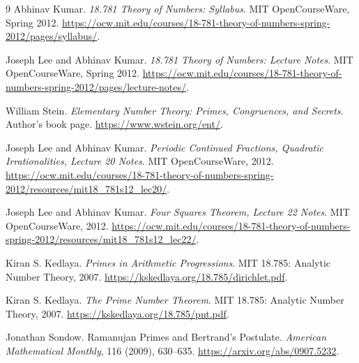 \documentclass[UTF8,12pt,a4paper,fontset=fandol]{ctexbook}
\begin{document}
\begin{thebibliography}{9}
  Abhinav Kumar.
  \textit{18.781 Theory of Numbers: Syllabus}.
  MIT OpenCourseWare, Spring 2012.
  \url{https://ocw.mit.edu/courses/18-781-theory-of-numbers-spring-2012/pages/syllabus/}.

  Joseph Lee and Abhinav Kumar.
  \textit{18.781 Theory of Numbers: Lecture Notes}.
  MIT OpenCourseWare, Spring 2012.
  \url{https://ocw.mit.edu/courses/18-781-theory-of-numbers-spring-2012/pages/lecture-notes/}.

  William Stein.
  \textit{Elementary Number Theory: Primes, Congruences, and Secrets}.
  Author's book page.
  \url{https://www.wstein.org/ent/}.

  Joseph Lee and Abhinav Kumar.
  \textit{Periodic Continued Fractions, Quadratic Irrationalities, Lecture 20 Notes}.
  MIT OpenCourseWare, 2012.
  \url{https://ocw.mit.edu/courses/18-781-theory-of-numbers-spring-2012/resources/mit18_781s12_lec20/}.

  Joseph Lee and Abhinav Kumar.
  \textit{Four Squares Theorem, Lecture 22 Notes}.
  MIT OpenCourseWare, 2012.
  \url{https://ocw.mit.edu/courses/18-781-theory-of-numbers-spring-2012/resources/mit18_781s12_lec22/}.

  Kiran S. Kedlaya.
  \textit{Primes in Arithmetic Progressions}.
  MIT 18.785: Analytic Number Theory, 2007.
  \url{https://kskedlaya.org/18.785/dirichlet.pdf}.

  Kiran S. Kedlaya.
  \textit{The Prime Number Theorem}.
  MIT 18.785: Analytic Number Theory, 2007.
  \url{https://kskedlaya.org/18.785/pnt.pdf}.

  Jonathan Sondow.
  Ramanujan Primes and Bertrand's Postulate.
  \textit{American Mathematical Monthly}, 116 (2009), 630--635.
  \url{https://arxiv.org/abs/0907.5232}.
\end{thebibliography}
\end{document}
